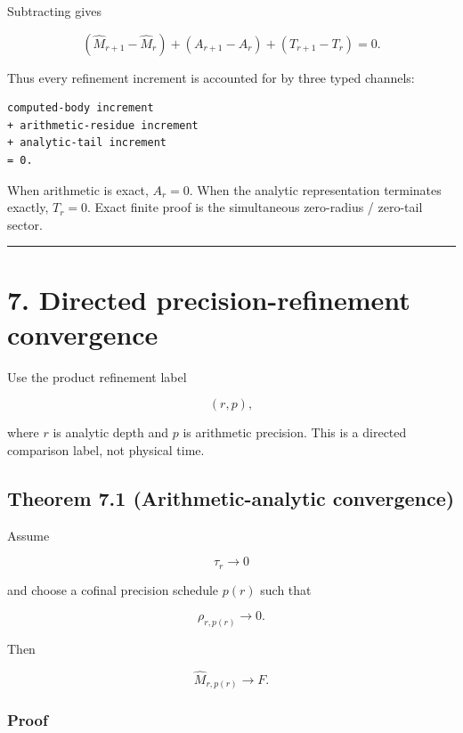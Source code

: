 Subtracting gives

\[
\boxed{
(\widehat M_{r+1}-\widehat M_r)
+(A_{r+1}-A_r)
+(T_{r+1}-T_r)=0.
}
\tag{6.2}
\]

Thus every refinement increment is accounted for by three typed channels:

\begin{verbatim}
computed-body increment
+ arithmetic-residue increment
+ analytic-tail increment
= 0.
\end{verbatim}

When arithmetic is exact, \(A_r=0\). When the analytic representation terminates
exactly, \(T_r=0\). Exact finite proof is the simultaneous zero-radius / zero-tail
sector.

\begin{center}\rule{0.5\linewidth}{0.5pt}\end{center}

\hypertarget{directed-precision-refinement-convergence}{%
\section{7. Directed precision-refinement convergence}\label{directed-precision-refinement-convergence}}

Use the product refinement label

\[
(r,p),
\tag{7.1}
\]

where \(r\) is analytic depth and \(p\) is arithmetic precision. This is a
directed comparison label, not physical time.

\hypertarget{theorem-7.1-arithmetic-analytic-convergence}{%
\subsection{Theorem 7.1 (Arithmetic-analytic convergence)}\label{theorem-7.1-arithmetic-analytic-convergence}}

Assume

\[
\tau_r\longrightarrow0
\tag{7.2}
\]

and choose a cofinal precision schedule \(p(r)\) such that

\[
\rho_{r,p(r)}\longrightarrow0.
\tag{7.3}
\]

Then

\[
\boxed{
\widehat M_{r,p(r)}\longrightarrow F.
}
\tag{7.4}
\]

\hypertarget{proof-1}{%
\subsubsection{Proof}\label{proof-1}}

